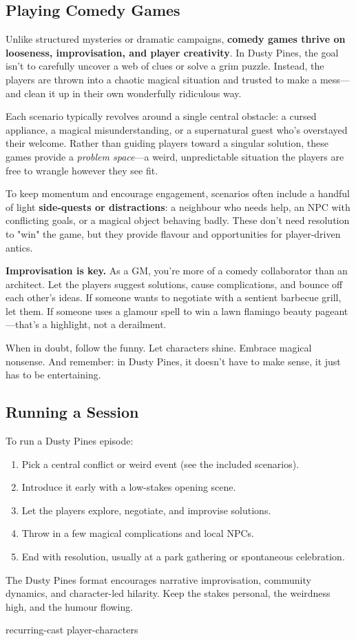 \subsection{Playing Comedy Games}

Unlike structured mysteries or dramatic campaigns, \textbf{comedy games thrive on looseness, improvisation, and player creativity}. In Dusty Pines, the goal isn't to carefully uncover a web of clues or solve a grim puzzle. Instead, the players are thrown into a chaotic magical situation and trusted to make a mess---and clean it up in their own wonderfully ridiculous way.

Each scenario typically revolves around a single central obstacle: a cursed appliance, a magical misunderstanding, or a supernatural guest who’s overstayed their welcome. Rather than guiding players toward a singular solution, these games provide a \textit{problem space}---a weird, unpredictable situation the players are free to wrangle however they see fit.

To keep momentum and encourage engagement, scenarios often include a handful of light \textbf{side-quests or distractions}: a neighbour who needs help, an NPC with conflicting goals, or a magical object behaving badly. These don't need resolution to "win" the game, but they provide flavour and opportunities for player-driven antics.

\textbf{Improvisation is key.} As a GM, you’re more of a comedy collaborator than an architect. Let the players suggest solutions, cause complications, and bounce off each other’s ideas. If someone wants to negotiate with a sentient barbecue grill, let them. If someone uses a glamour spell to win a lawn flamingo beauty pageant---that’s a highlight, not a derailment.

When in doubt, follow the funny. Let characters shine. Embrace magical nonsense. And remember: in Dusty Pines, it doesn’t have to make sense, it just has to be entertaining.


\subsection{Running a Session}

To run a Dusty Pines episode:

\begin{enumerate}
  \item Pick a central conflict or weird event (see the included scenarios).
  \item Introduce it early with a low-stakes opening scene.
  \item Let the players explore, negotiate, and improvise solutions.
  \item Throw in a few magical complications and local NPCs.
  \item End with resolution, usually at a park gathering or spontaneous celebration.
\end{enumerate}

The Dusty Pines format encourages narrative improvisation, community dynamics, and character-led hilarity. Keep the stakes personal, the weirdness high, and the humour flowing.

{recurring-cast}
{player-characters}
